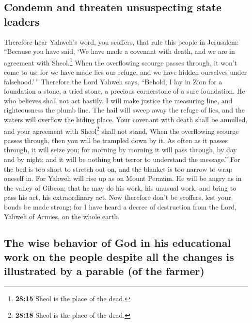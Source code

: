 \hypertarget{condemn-and-threaten-unsuspecting-state-leaders}{%
\subsection{Condemn and threaten unsuspecting state
leaders}\label{condemn-and-threaten-unsuspecting-state-leaders}}

 Therefore hear Yahweh's word, you scoffers, that rule
this people in Jerusalem:  ``Because you have said, `We
have made a covenant with death, and we are in agreement with
Sheol.\footnote{\textbf{28:15} Sheol is the place of the dead.} When the
overflowing scourge passes through, it won't come to us; for we have
made lies our refuge, and we have hidden ourselves under falsehood.'\,''
 Therefore the Lord Yahweh says, ``Behold, I lay in Zion
for a foundation a stone, a tried stone, a precious cornerstone of a
sure foundation. He who believes shall not act hastily. 
I will make justice the measuring line, and righteousness the plumb
line. The hail will sweep away the refuge of lies, and the waters will
overflow the hiding place.  Your covenant with death
shall be annulled, and your agreement with Sheol\footnote{\textbf{28:18}
  Sheol is the place of the dead.} shall not stand. When the overflowing
scourge passes through, then you will be trampled down by it.
 As often as it passes through, it will seize you; for
morning by morning it will pass through, by day and by night; and it
will be nothing but terror to understand the message.'' 
For the bed is too short to stretch out on, and the blanket is too
narrow to wrap oneself in.  For Yahweh will rise up as on
Mount Perazim. He will be angry as in the valley of Gibeon; that he may
do his work, his unusual work, and bring to pass his act, his
extraordinary act.  Now therefore don't be scoffers, lest
your bonds be made strong; for I have heard a decree of destruction from
the Lord, Yahweh of Armies, on the whole earth.

\hypertarget{the-wise-behavior-of-god-in-his-educational-work-on-the-people-despite-all-the-changes-is-illustrated-by-a-parable-of-the-farmer}{%
\subsection{The wise behavior of God in his educational work on the
people despite all the changes is illustrated by a parable (of the
farmer)}\label{the-wise-behavior-of-god-in-his-educational-work-on-the-people-despite-all-the-changes-is-illustrated-by-a-parable-of-the-farmer}}

